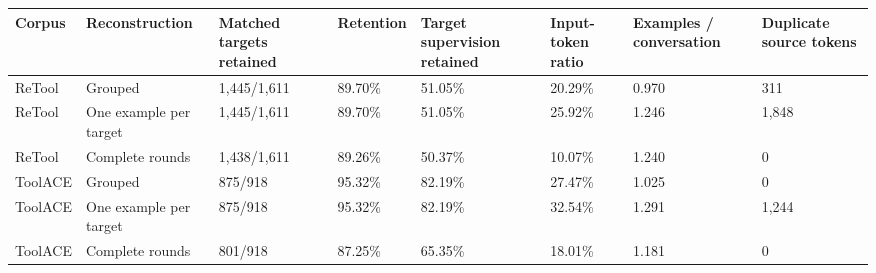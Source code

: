 \begin{tabular}{llllllll}
\toprule
Corpus & Reconstruction & Matched targets retained & Retention & Target supervision retained & Input-token ratio & Examples / conversation & Duplicate source tokens \\
\midrule
ReTool & Grouped & 1,445/1,611 & 89.70\% & 51.05\% & 20.29\% & 0.970 & 311 \\
ReTool & One example per target & 1,445/1,611 & 89.70\% & 51.05\% & 25.92\% & 1.246 & 1,848 \\
ReTool & Complete rounds & 1,438/1,611 & 89.26\% & 50.37\% & 10.07\% & 1.240 & 0 \\
ToolACE & Grouped & 875/918 & 95.32\% & 82.19\% & 27.47\% & 1.025 & 0 \\
ToolACE & One example per target & 875/918 & 95.32\% & 82.19\% & 32.54\% & 1.291 & 1,244 \\
ToolACE & Complete rounds & 801/918 & 87.25\% & 65.35\% & 18.01\% & 1.181 & 0 \\
\bottomrule
\end{tabular}